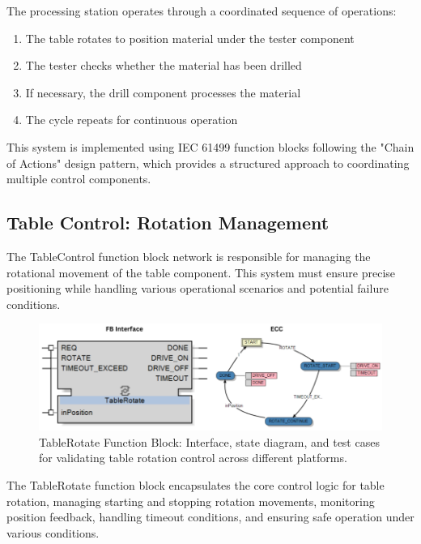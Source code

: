The processing station operates through a coordinated sequence of operations:

\begin{enumerate}
    \item The table rotates to position material under the tester component
    \item The tester checks whether the material has been drilled
    \item If necessary, the drill component processes the material
    \item The cycle repeats for continuous operation
\end{enumerate}

This system is implemented using IEC 61499 function blocks following the "Chain of Actions" design pattern, which provides a structured approach to coordinating multiple control components.

\subsection{Table Control: Rotation Management}

The TableControl function block network is responsible for managing the rotational movement of the table component. This system must ensure precise positioning while handling various operational scenarios and potential failure conditions.

\begin{figure}[!htbp]
    \centering
    \includegraphics[width=0.99\linewidth]{MX_Papers/Paper10/Figures/TableRotate.png}
    \caption{TableRotate Function Block: Interface, state diagram, and test cases for validating table rotation control across different platforms.}
    \label{fig:table_rotate}
\end{figure}

The TableRotate function block encapsulates the core control logic for table rotation, managing starting and stopping rotation movements, monitoring position feedback, handling timeout conditions, and ensuring safe operation under various conditions.

